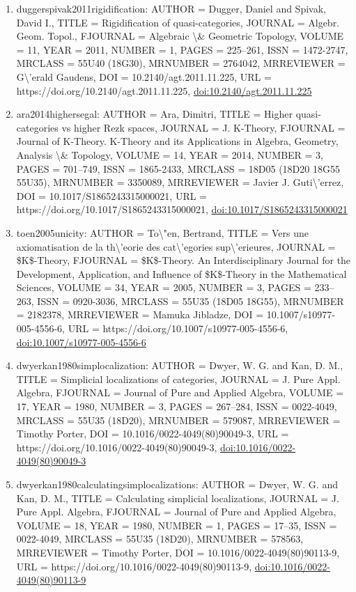 \documentclass[11pt]{article}
\begin{document}
\begin{enumerate}[leftmargin=*]
  \item duggerspivak2011rigidification: AUTHOR = Dugger, Daniel and Spivak, David I., TITLE = Rigidification of quasi-categories, JOURNAL = Algebr. Geom. Topol., FJOURNAL = Algebraic \textbackslash{}\& Geometric Topology, VOLUME = 11, YEAR = 2011, NUMBER = 1, PAGES = 225--261, ISSN = 1472-2747, MRCLASS = 55U40 (18G30), MRNUMBER = 2764042, MRREVIEWER = G\textbackslash{}'erald Gaudens, DOI = 10.2140/agt.2011.11.225, URL = https://doi.org/10.2140/agt.2011.11.225, \href{https://doi.org/10.2140/agt.2011.11.225}{doi:10.2140/agt.2011.11.225}
  \item ara2014highersegal: AUTHOR = Ara, Dimitri, TITLE = Higher quasi-categories vs higher Rezk spaces, JOURNAL = J. K-Theory, FJOURNAL = Journal of K-Theory. K-Theory and its Applications in Algebra, Geometry, Analysis \textbackslash{}\& Topology, VOLUME = 14, YEAR = 2014, NUMBER = 3, PAGES = 701--749, ISSN = 1865-2433, MRCLASS = 18D05 (18D20 18G55 55U35), MRNUMBER = 3350089, MRREVIEWER = Javier J. Guti\textbackslash{}'errez, DOI = 10.1017/S1865243315000021, URL = https://doi.org/10.1017/S1865243315000021, \href{https://doi.org/10.1017/S1865243315000021}{doi:10.1017/S1865243315000021}
  \item toen2005unicity: AUTHOR = To\textbackslash{}"en, Bertrand, TITLE = Vers une axiomatisation de la th\textbackslash{}'eorie des cat\textbackslash{}'egories sup\textbackslash{}'erieures, JOURNAL = \$K\$-Theory, FJOURNAL = \$K\$-Theory. An Interdisciplinary Journal for the Development, Application, and Influence of \$K\$-Theory in the Mathematical Sciences, VOLUME = 34, YEAR = 2005, NUMBER = 3, PAGES = 233--263, ISSN = 0920-3036, MRCLASS = 55U35 (18D05 18G55), MRNUMBER = 2182378, MRREVIEWER = Mamuka Jibladze, DOI = 10.1007/s10977-005-4556-6, URL = https://doi.org/10.1007/s10977-005-4556-6, \href{https://doi.org/10.1007/s10977-005-4556-6}{doi:10.1007/s10977-005-4556-6}
  \item dwyerkan1980simplocalization: AUTHOR = Dwyer, W. G. and Kan, D. M., TITLE = Simplicial localizations of categories, JOURNAL = J. Pure Appl. Algebra, FJOURNAL = Journal of Pure and Applied Algebra, VOLUME = 17, YEAR = 1980, NUMBER = 3, PAGES = 267--284, ISSN = 0022-4049, MRCLASS = 55U35 (18D20), MRNUMBER = 579087, MRREVIEWER = Timothy Porter, DOI = 10.1016/0022-4049(80)90049-3, URL = https://doi.org/10.1016/0022-4049(80)90049-3, \href{https://doi.org/10.1016/0022-4049(80)90049-3}{doi:10.1016/0022-4049(80)90049-3}
  \item dwyerkan1980calculatingsimplocalizations: AUTHOR = Dwyer, W. G. and Kan, D. M., TITLE = Calculating simplicial localizations, JOURNAL = J. Pure Appl. Algebra, FJOURNAL = Journal of Pure and Applied Algebra, VOLUME = 18, YEAR = 1980, NUMBER = 1, PAGES = 17--35, ISSN = 0022-4049, MRCLASS = 55U35 (18D20), MRNUMBER = 578563, MRREVIEWER = Timothy Porter, DOI = 10.1016/0022-4049(80)90113-9, URL = https://doi.org/10.1016/0022-4049(80)90113-9, \href{https://doi.org/10.1016/0022-4049(80)90113-9}{doi:10.1016/0022-4049(80)90113-9}

\end{enumerate}
\end{document}
